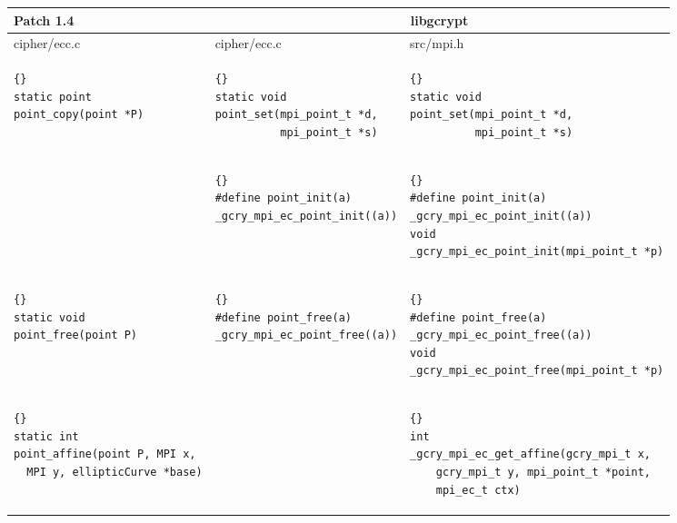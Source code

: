 \documentclass[12pt,twoside,catalan,a4paper]{book}%
\numberwithin{figure}{section}		%
\theoremstyle{definition}   			%
\theoremstyle{saltolinea}   			%
\begin{document}
\begin{table}
 \begin{center}
\begin{sideways}
\begin{tabular}{|l||l|l|}
\hline
Patch 1.4 & \multicolumn{2}{c|}{libgcrypt} \\
\hline
 {\sf cipher/ecc.c}     & {\sf cipher/ecc.c} & {\sf src/mpi.h} \\
\hline
 {\tt \begin{lstlisting}{}
static point
point_copy(point *P)
      \end{lstlisting} }
 &
 {\tt \begin{lstlisting}{}
static void
point_set(mpi_point_t *d,
          mpi_point_t *s)
      \end{lstlisting} }
 &
 {\tt \begin{lstlisting}{}
static void
point_set(mpi_point_t *d,
          mpi_point_t *s)
      \end{lstlisting} }
 \\
\hline
 &
 {\tt \begin{lstlisting}{}
#define point_init(a)
_gcry_mpi_ec_point_init((a))
      \end{lstlisting} }
 &
 {\tt \begin{lstlisting}{}
#define point_init(a)
_gcry_mpi_ec_point_init((a))
void
_gcry_mpi_ec_point_init(mpi_point_t *p)
      \end{lstlisting} }
 \\
\hline
 {\tt \begin{lstlisting}{}
static void
point_free(point P)
      \end{lstlisting} }
 &
 {\tt \begin{lstlisting}{}
#define point_free(a)
_gcry_mpi_ec_point_free((a))
      \end{lstlisting} }
 &
 {\tt \begin{lstlisting}{}
#define point_free(a)
_gcry_mpi_ec_point_free((a))
void
_gcry_mpi_ec_point_free(mpi_point_t *p)
      \end{lstlisting} }
 \\
\hline
 {\tt \begin{lstlisting}{}
static int
point_affine(point P, MPI x,
  MPI y, ellipticCurve *base)
      \end{lstlisting} }
 & &
 {\tt \begin{lstlisting}{}
int
_gcry_mpi_ec_get_affine(gcry_mpi_t x,
    gcry_mpi_t y, mpi_point_t *point,
    mpi_ec_t ctx)
      \end{lstlisting} }
 \\

\end{tabular}
\end{sideways}
\end{center}
\end{table}
\end{document}
